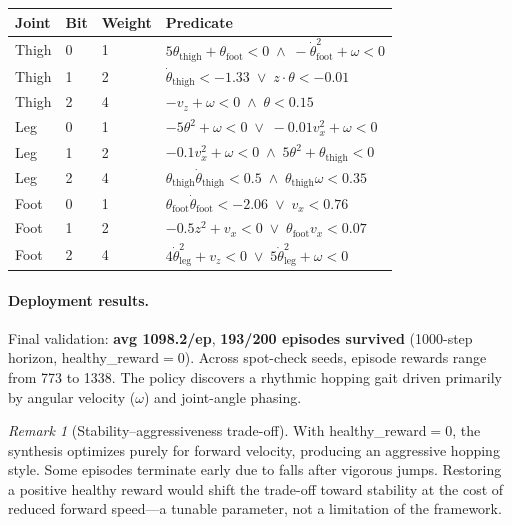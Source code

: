 \documentclass[9pt,a4paper]{article}
\theoremstyle{plain}
\theoremstyle{definition}
\theoremstyle{remark}
\newtheorem{remark}{Remark}
\begin{document}
\begin{center}
\small
\begin{tabular}{@{}llll@{}}
\textbf{Joint} & \textbf{Bit} & \textbf{Weight} & \textbf{Predicate} \\
\hline
Thigh & 0 & 1 & $5\theta_{\text{thigh}} + \theta_{\text{foot}} < 0 \;\wedge\; -\dot\theta_{\text{foot}}^2 + \omega < 0$ \\
Thigh & 1 & 2 & $\dot\theta_{\text{thigh}} < -1.33 \;\vee\; z \cdot \theta < -0.01$ \\
Thigh & 2 & 4 & $-v_z + \omega < 0 \;\wedge\; \theta < 0.15$ \\
\hline
Leg & 0 & 1 & $-5\theta^2 + \omega < 0 \;\vee\; -0.01 v_x^2 + \omega < 0$ \\
Leg & 1 & 2 & $-0.1 v_x^2 + \omega < 0 \;\wedge\; 5\theta^2 + \theta_{\text{thigh}} < 0$ \\
Leg & 2 & 4 & $\theta_{\text{thigh}} \dot\theta_{\text{thigh}} < 0.5 \;\wedge\; \theta_{\text{thigh}} \omega < 0.35$ \\
\hline
Foot & 0 & 1 & $\theta_{\text{foot}} \dot\theta_{\text{foot}} < -2.06 \;\vee\; v_x < 0.76$ \\
Foot & 1 & 2 & $-0.5 z^2 + v_x < 0 \;\vee\; \theta_{\text{foot}} v_x < 0.07$ \\
Foot & 2 & 4 & $4\dot\theta_{\text{leg}}^2 + v_z < 0 \;\vee\; 5\dot\theta_{\text{leg}}^2 + \omega < 0$ \\
\end{tabular}
\end{center}

\paragraph{Deployment results.}
Final validation: \textbf{avg 1098.2/ep}, \textbf{193/200 episodes survived}
(1000-step horizon, healthy\_reward${}=0$).
Across spot-check seeds, episode rewards range from 773 to 1338.
The policy discovers a rhythmic hopping gait driven primarily by
angular velocity ($\omega$) and joint-angle phasing.

\begin{remark}[Stability--aggressiveness trade-off]
With healthy\_reward${}=0$, the synthesis optimizes purely for
forward velocity, producing an aggressive hopping style.
Some episodes terminate early due to falls after vigorous jumps.
Restoring a positive healthy reward would shift the trade-off
toward stability at the cost of reduced forward speed---a tunable
parameter, not a limitation of the framework.
\end{remark}
\end{document}
